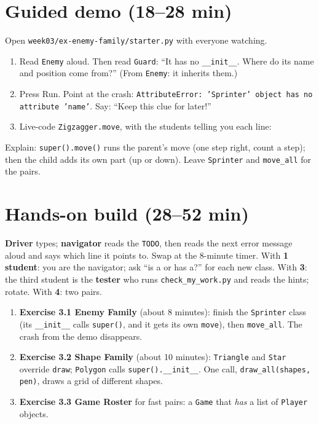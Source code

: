 \section{Guided demo (18--28 min)}
Open \texttt{week03/ex-enemy-family/starter.py} with everyone watching.
\begin{workedexample}
\begin{enumerate}[itemsep=2pt]
  \item Read \texttt{Enemy} aloud. Then read \texttt{Guard}: \enquote{It has no \texttt{\_\_init\_\_}. Where do its name and position come from?} (From \texttt{Enemy}: it inherits them.)
  \item Press Run. Point at the crash: \texttt{AttributeError: 'Sprinter' object has no attribute 'name'}. Say: \enquote{Keep this clue for later!}
  \item Live-code \texttt{Zigzagger.move}, with the students telling you each line:
\end{enumerate}
Explain: \texttt{super().move()} runs the parent's move (one step right, count a step); then the child adds its own part (up or down). Leave \texttt{Sprinter} and \texttt{move\_all} for the pairs.
\end{workedexample}

\section{Hands-on build (28--52 min)}
\begin{pairroles}
\textbf{Driver} types; \textbf{navigator} reads the \texttt{TODO}, then reads the next error message aloud and says which line it points to. Swap at the 8-minute timer.
With \textbf{1 student}: you are the navigator; ask \enquote{is a or has a?} for each new class. With \textbf{3}: the third student is the \textbf{tester} who runs \texttt{check\_my\_work.py} and reads the hints; rotate. With \textbf{4}: two pairs.
\end{pairroles}
\begin{enumerate}[itemsep=2pt]
  \item \textbf{Exercise 3.1 Enemy Family} (about 8 minutes): finish the \texttt{Sprinter} class (its \texttt{\_\_init\_\_} calls \texttt{super()}, and it gets its own \texttt{move}), then \texttt{move\_all}. The crash from the demo disappears.
  \item \textbf{Exercise 3.2 Shape Family} (about 10 minutes): \texttt{Triangle} and \texttt{Star} override \texttt{draw}; \texttt{Polygon} calls \texttt{super().\_\_init\_\_}. One call, \texttt{draw\_all(shapes, pen)}, draws a grid of different shapes.
  \item \textbf{Exercise 3.3 Game Roster} for fast pairs: a \texttt{Game} that \emph{has} a list of \texttt{Player} objects.
\end{enumerate}

